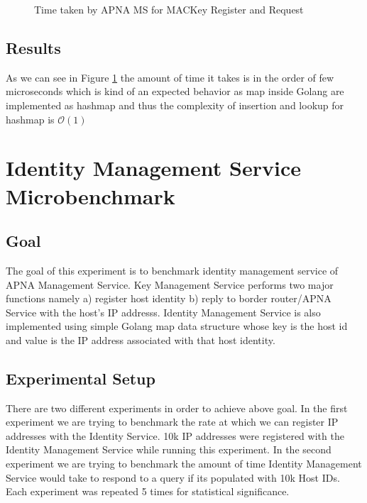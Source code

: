 \begin{figure}[th!!]
\centering
\noindent
{}
\decoRule
\caption[MACKey Operations]{Time taken by APNA MS for MACKey Register and Request}
\label{fig:perf_mac}
\end{figure}

\subsection{Results}
As we can see in Figure \ref{fig:perf_mac} the amount of time it takes is in the order of few microseconds which is kind of an expected behavior as map inside Golang are implemented as hashmap and thus the complexity of insertion and lookup for hashmap is $\mathcal{O}(1)$ 

\section{Identity Management Service Microbenchmark}
\subsection{Goal}
The goal of this experiment is to benchmark identity management service of APNA Management Service. Key Management Service performs two major functions namely a) register host identity b) reply to border router/APNA Service with the host's IP addresss. Identity Management Service is also implemented using simple Golang map data structure whose key is the host id and value is the IP address associated with that host identity.

\subsection{Experimental Setup}
There are two different experiments in order to achieve above goal. In the first experiment we are trying to benchmark the rate at which we can register IP addresses with the Identity Service. 10k IP addresses were registered with the Identity Management Service while running this experiment. In the second experiment we are trying to benchmark the amount of time Identity Management Service would take to respond to a query if its populated with 10k Host IDs. Each experiment was repeated 5 times for statistical significance.

